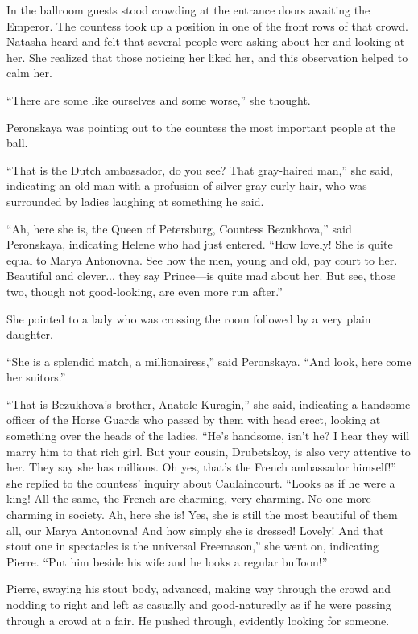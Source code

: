 In the ballroom guests stood crowding at the entrance doors
awaiting the Emperor. The countess took up a position in one of
the front rows of that crowd. Natasha heard and felt that several
people were asking about her and looking at her. She realized
that those noticing her liked her, and this observation helped to
calm her.

``There are some like ourselves and some worse,'' she thought.

Peronskaya was pointing out to the countess the most important
people at the ball.

``That is the Dutch ambassador, do you see? That gray-haired
man,'' she said, indicating an old man with a profusion of
silver-gray curly hair, who was surrounded by ladies laughing at
something he said.

``Ah, here she is, the Queen of Petersburg, Countess Bezukhova,''
said Peronskaya, indicating Helene who had just entered. ``How
lovely! She is quite equal to Marya Antonovna. See how the men,
young and old, pay court to her. Beautiful and clever... they say
Prince---is quite mad about her. But see, those two, though not
good-looking, are even more run after.''

She pointed to a lady who was crossing the room followed by a
very plain daughter.

``She is a splendid match, a millionairess,'' said
Peronskaya. ``And look, here come her suitors.''

``That is Bezukhova's brother, Anatole Kuragin,'' she said,
indicating a handsome officer of the Horse Guards who passed by
them with head erect, looking at something over the heads of the
ladies. ``He's handsome, isn't he? I hear they will marry him to
that rich girl. But your cousin, Drubetskoy, is also very
attentive to her. They say she has millions. Oh yes, that's the
French ambassador himself!'' she replied to the countess' inquiry
about Caulaincourt. ``Looks as if he were a king! All the same,
the French are charming, very charming. No one more charming in
society.  Ah, here she is! Yes, she is still the most beautiful
of them all, our Marya Antonovna! And how simply she is dressed!
Lovely! And that stout one in spectacles is the universal
Freemason,'' she went on, indicating Pierre. ``Put him beside his
wife and he looks a regular buffoon!''

Pierre, swaying his stout body, advanced, making way through the
crowd and nodding to right and left as casually and
good-naturedly as if he were passing through a crowd at a
fair. He pushed through, evidently looking for someone.

